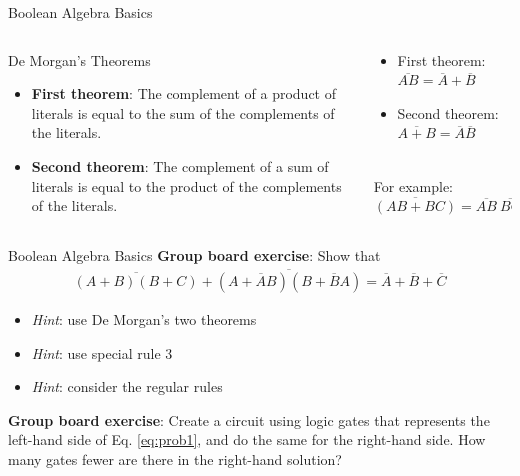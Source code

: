 \documentclass{beamer}
\begin{document}
\begin{frame}{Boolean Algebra Basics}
\begin{columns}[T]
\begin{column}{0.5\textwidth}
De Morgan's Theorems \\ \hrulefill
\begin{itemize}
\small
\item \textbf{First theorem}: The complement of a product of literals is equal to the sum of the complements of the literals.
\item \textbf{Second theorem}: The complement of a sum of literals is equal to the product of the complements of the literals.
\end{itemize}
\end{column}
\begin{column}{0.5\textwidth}
\begin{itemize}
\item First theorem: $\overline{AB} = \overline{A}+\overline{B}$
\item Second theorem: $\overline{A+B} = \overline{A}\overline{B}$
\end{itemize} \hrulefill \\
For example: \\ 
$\overline{(AB+BC)} = \overline{AB}~\overline{BC} = (\overline{A}+\overline{B})(\overline{B}+\overline{C})$
\end{column}
\end{columns}
\end{frame}

\begin{frame}{Boolean Algebra Basics}
\small
\textbf{Group board exercise}: Show that
\begin{equation}
\begin{multlined}
\boxed{
\overline{(A+B)(B+C)}+\overline{(A+\overline{A}B)(B+\overline{B}A)}=\overline{A}+\overline{B}+\overline{C}} \label{eq:prob1}
\end{multlined}
\end{equation}
\begin{itemize}
\item \textit{Hint}: use De Morgan's two theorems
\item \textit{Hint}: use special rule 3
\item \textit{Hint}: consider the regular rules
\end{itemize}
\textbf{Group board exercise}: Create a circuit using logic gates that represents the left-hand side of Eq. \ref{eq:prob1}, and do the same for the right-hand side.  How many gates fewer are there in the right-hand solution?
\end{frame}
\end{document}
